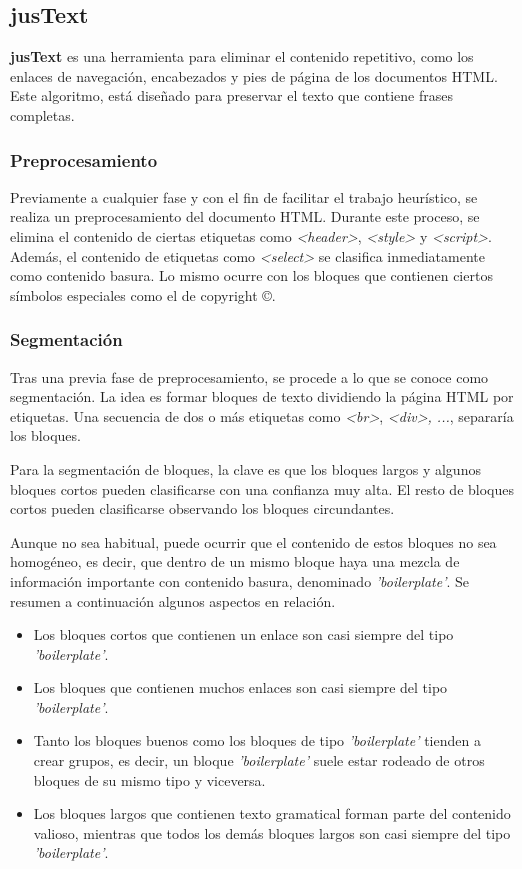 \subsection{jusText}
\label{subsec:justext}

\textbf{jusText} \cite{justext} es una herramienta para eliminar el contenido repetitivo, como los enlaces
de navegación, encabezados y pies de página de los documentos HTML. Este algoritmo, está diseñado para
preservar el texto que contiene frases completas.

\subsubsection{Preprocesamiento}
\label{subsubsec:preprocesamiento}

Previamente a cualquier fase y con el fin de facilitar el trabajo heurístico, se realiza un preprocesamiento 
del documento HTML. Durante este proceso, se elimina el contenido de ciertas etiquetas como \emph{<header>}, 
\emph{<style>} y \emph{<script>}. Además, el contenido de etiquetas como \emph{<select>} se clasifica 
inmediatamente como contenido basura. Lo mismo ocurre con los bloques que contienen ciertos símbolos 
especiales como el de copyright ©.

\subsubsection{Segmentación}
\label{subsubsec:segmentacion}

Tras una previa fase de preprocesamiento, se procede a lo que se conoce como segmentación. La idea es formar 
bloques de texto dividiendo la página HTML por etiquetas. Una secuencia de dos o más etiquetas como 
\emph{<br>}, \emph{<div>, ...}, separaría los bloques. 

Para la segmentación de bloques, la clave es que los bloques largos y algunos bloques cortos pueden
clasificarse con una confianza muy alta. El resto de bloques cortos pueden clasificarse observando los
bloques circundantes. 

Aunque no sea habitual, puede ocurrir que el contenido de estos bloques no sea homogéneo, es decir, que
dentro de un mismo bloque haya una mezcla de información importante con contenido basura, denominado
\emph{'boilerplate'}. Se resumen a continuación algunos aspectos en relación.

\begin{itemize}
  \item Los bloques cortos que contienen un enlace son casi siempre del tipo \emph{'boilerplate'}.
  \item Los bloques que contienen muchos enlaces son casi siempre del tipo \emph{'boilerplate'}.
  \item Tanto los bloques buenos como los bloques de tipo \emph{'boilerplate'} tienden a crear grupos, es 
  decir, un bloque \emph{'boilerplate'} suele estar rodeado de otros bloques de su mismo tipo y viceversa.
  \item Los bloques largos que contienen texto gramatical forman parte del contenido valioso, mientras que 
  todos los demás bloques largos son casi siempre del tipo \emph{'boilerplate'}.
\end{itemize}

